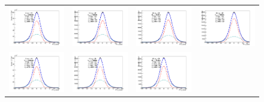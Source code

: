 \begin{figure}[!ht]
\begin{tabular}{cccc}
  \includegraphics[width=100pt]{figuresARC/recoil/FITS/MC/pfu1fit_0.png} &
  \includegraphics[width=100pt]{figuresARC/recoil/FITS/MC/pfu1fit_1MC.png} &
  \includegraphics[width=100pt]{figuresARC/recoil/FITS/MC/pfu1fit_2.png} &
  \includegraphics[width=100pt]{figuresARC/recoil/FITS/MC/pfu1fit_3.png} \\
  \includegraphics[width=100pt]{figuresARC/recoil/FITS/MC/pfu2fit_0.png} &
  \includegraphics[width=100pt]{figuresARC/recoil/FITS/MC/pfu2fit_1MC.png} &
  \includegraphics[width=100pt]{figuresARC/recoil/FITS/MC/pfu2fit_2.png} &

\end{tabular}
\end{figure}
